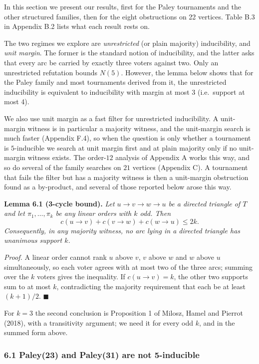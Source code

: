 \documentclass[
]{article}
\begin{document}
In this section we present our results, first for the Paley tournaments
and the other structured families, then for the eight obstructions on 22
vertices. Table B.3 in Appendix B.2 lists what each result rests on.

The two regimes we explore are \emph{unrestricted} (or plain majority)
inducibility, and \emph{unit margin}. The former is the standard notion
of inducibility, and the latter asks that every arc be carried by
exactly three voters against two. Only an unrestricted refutation bounds
\(N(5)\). However, the lemma below shows that for the Paley family and
most tournaments derived from it, the unrestricted inducibility is
equivalent to inducibility with margin at most \(3\) (i.e.~support at
most 4).

We also use unit margin as a fast filter for unrestricted inducibility.
A unit-margin witness is in particular a majority witness, and the
unit-margin search is much faster (Appendix F.4), so when the question
is only whether a tournament is \(5\)-inducible we search at unit margin
first and at plain majority only if no unit-margin witness exists. The
order-\(12\) analysis of Appendix A works this way, and so do several of
the family searches on \(21\) vertices (Appendix C). A tournament that
fails the filter but has a majority witness is then a unit-margin
obstruction found as a by-product, and several of those reported below
arose this way.

\textbf{Lemma 6.1 (3-cycle bound).} \emph{Let \(u \to v \to w \to u\) be
a directed triangle of \(T\) and let \(\pi_1,\dots,\pi_k\) be any linear
orders with \(k\) odd. Then}
\[c(u\to v) + c(v \to w) + c(w \to u) \le 2k.\] \emph{Consequently, in
any majority witness, no arc lying in a directed triangle has unanimous
support \(k\).}

\emph{Proof.} A linear order cannot rank \(u\) above \(v\), \(v\) above
\(w\) and \(w\) above \(u\) simultaneously, so each voter agrees with at
most two of the three arcs; summing over the \(k\) voters gives the
inequality. If \(c(u \to v) = k\), the other two supports sum to at most
\(k\), contradicting the majority requirement that each be at least
\((k+1)/2\). \(\blacksquare\)

For \(k = 3\) the second conclusion is Proposition 1 of Milosz, Hamel
and Pierrot (2018), with a transitivity argument; we need it for every
odd \(k\), and in the summed form above.

\subsubsection{6.1 Paley(23) and Paley(31) are not
5-inducible}\label{paley23-and-paley31-are-not-5-inducible}
\end{document}
